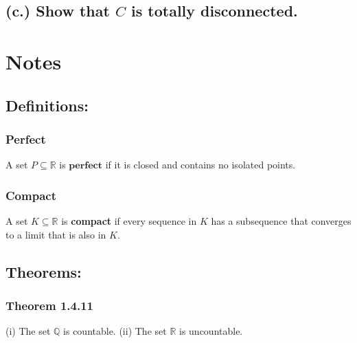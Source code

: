 \documentclass{article}
\begin{document}
\subsection*{(c.) Show that $C$ is totally disconnected.}










\section*{Notes}
\subsection*{\textbf{Definitions:}}
\subsubsection*{Perfect}
A set $P \subseteq \mathbb{R}$ is $\textbf{perfect}$ if it is closed and contains no isolated points.
\subsubsection*{Compact}
A set $K \subseteq \mathbb{R}$ is \textbf{compact} if every sequence in $K$ has a subsequence that converges to a limit that is also in $K$.

\subsection*{\textbf{Theorems:}}
\subsubsection*{Theorem 1.4.11}
(i) The set $\mathbb{Q}$ is countable. (ii) The set $\mathbb{R}$ is uncountable.
\end{document}
